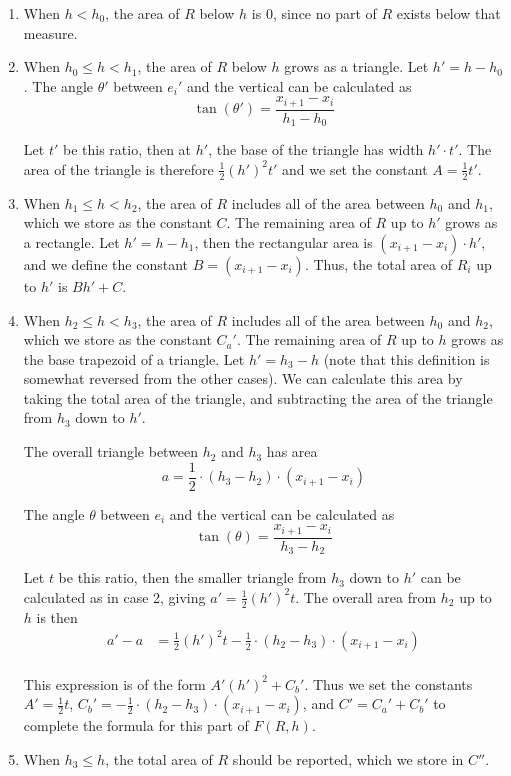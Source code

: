 \begin{enumerate}
\item When $h < h_0$, the area of $R$ below $h$ is 0, since no part of $R$ exists below that measure.

\item When $h_0 \leq h < h_1$, the area of $R$ below $h$ grows as a triangle. Let $h' = h - h_0$.
The angle $\theta'$ between $e_i'$ and the vertical can be calculated as 
\[ 
\tan(\theta') = \frac{x_{i+1} - x_i}{h_1 - h_0}
\]

Let $t'$ be this ratio, then at $h'$, the base of the triangle has width $h' \cdot t'$. The area of the triangle is therefore $\frac{1}{2} (h')^2 t'$ and we set the constant $A = \frac{1}{2} t'$.

\item When $h_1 \leq h < h_2$, the area of $R$ includes all of the area between $h_0$ and $h_1$, which we store as the constant $C$.
The remaining area of $R$ up to $h'$ grows as a rectangle.
Let $h' = h - h_1$, then the rectangular area is $(x_{i+1} - x_i)\cdot h'$, and we define the constant $B = (x_{i+1} - x_i)$.
Thus, the total area of $R_i$ up to $h'$ is $Bh' + C$.

\item When $h_2 \leq h < h_3$, the area of $R$ includes all of the area between $h_0$ and $h_2$, which we store as the constant $C_a'$.
The remaining area of $R$ up to $h$ grows as the base trapezoid of a triangle.
Let $h' = h_3 - h$ (note that this definition is somewhat reversed from the other cases).
We can calculate this area by taking the total area of the triangle, and subtracting the area of the triangle from $h_3$ down to $h'$.  

The overall triangle between $h_2$ and $h_3$ has area 
\[ 
a = \frac{1}{2} \cdot (h_3 - h_2) \cdot (x_{i+1} - x_i) 
\]

The angle $\theta$ between $e_i$ and the vertical can be calculated as
\[ 
\tan(\theta) = \frac{x_{i+1} - x_i}{h_3 - h_2}
\]

Let $t$ be this ratio, then the smaller triangle from $h_3$ down to $h'$ can be calculated as in case 2, giving $a' = \frac{1}{2}(h')^2 t$. 
The overall area from $h_2$ up to $h$ is then
\[ 
\begin{split}
a' - a &= \frac{1}{2}(h')^2 t - \frac{1}{2} \cdot (h_2 - h_3) \cdot (x_{i+1} - x_i) \\
%
\end{split}
\]

This expression is of the form $A'(h')^2 + C_b'$.
Thus we set the constants $A' = \frac{1}{2}t$, $C_b' = -\frac{1}{2} \cdot (h_2 - h_3) \cdot (x_{i+1} - x_i)$, and $C' = C_a' + C_b'$ to complete the formula for this part of $F(R, h)$.

\item When $h_3 \leq h$, the total area of $R$ should be reported, which we store in $C''$.

\end{enumerate}

